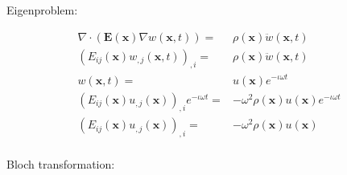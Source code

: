 \documentclass{article}
\newcommand{\imag}{\iota}
\newcommand{\vect}[1]{\boldsymbol{#1}}
\newcommand{\x}{x}
\newcommand{\vecx}{\vect{\x}}
\begin{document}
Eigenproblem:

\begin{align}
    \nabla \cdot \left(
        \boldsymbol{E}(\vecx) \nabla w(\vecx, t)
    \right) =& \rho(\vecx) \ddot{w}(\vecx, t) \nonumber \\
    \left(
        E_{ij}(\vecx) w_{,j}(\vecx, t)
    \right)_{,i} =& \rho(\vecx) \ddot{w}(\vecx, t) \nonumber \\
    w(\vecx, t) =& u(\vecx) e^{-\imag \omega t} \nonumber \\
    \left(
        E_{ij}(\vecx) u_{,j}(\vecx)
    \right)_{,i} e^{-\imag \omega t} =& -\omega^2 \rho(\vecx) u(\vecx) e^{
        -\imag \omega t
    } \nonumber \\
    \left(
        E_{ij}(\vecx) u_{,j}(\vecx)
    \right)_{,i} =& -\omega^2 \rho(\vecx) u(\vecx) \\
\end{align}

Bloch transformation:
\end{document}
